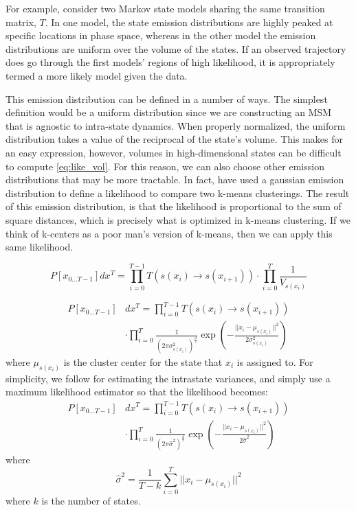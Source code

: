 \documentclass[twocolumn,floatfix,nofootinbib,aps]{revtex4-1}
\begin{document}
For example, consider two Markov state models sharing the same transition matrix, $T$. In one model, the state emission distributions are highly peaked at specific locations in phase space, whereas in the other model the emission distributions are uniform over the volume of the states. If an observed trajectory does go through the first models' regions of high likelihood, it is appropriately termed a more likely model given the data.

This emission distribution can be defined in a number of ways. The simplest definition would be a uniform distribution since we are constructing an MSM that is agnostic to intra-state dynamics. When properly normalized, the uniform distribution takes a value of the reciprocal of the state's volume. This makes for an easy expression, however, volumes in high-dimensional states can be difficult to compute \ref{eq:like_vol}. For this reason, we can also choose other emission distributions that may be more tractable. In fact, \citet{Pelleg2000Xmeans} have used a gaussian emission distribution to define a likelihood to compare two k-means clusterings. The result of this emission distribution, is that the likelihood is proportional to the sum of square distances, which is precisely what is optimized in k-means clustering. If we think of k-centers as a poor man's version of k-means, then we can apply this same likelihood.

\begin{equation}
\label{eq:like_vol}
P[x_{0...T-1}] dx^T = \prod_{i=0}^{T-1} T(s(x_i) \rightarrow s(x_{i+1})) \cdot \prod_{i=0}^T \frac{1}{V_{s(x_{i})}}
\end{equation}

\begin{equation}
\label{eq:like_mvn}
\begin{split}
P[x_{0...T-1}] & dx^T = \prod_{i=0}^{T-1} T(s(x_i) \rightarrow s(x_{i+1})) \\
	&\cdot \prod_{i=0}^T \frac{1}{\left(2 \pi \sigma_{s(x_{i})}^2\right)^\frac{d}{2}} \exp\left(-\frac{||x_i - \mu_{s(x_i)}||^2}{2 \sigma_{s(x_{i})}^2}\right)
\end{split}
\end{equation} where $\mu_{s(x_i)}$ is the cluster center for the state that $x_i$ is assigned to. For simplicity, we follow \citet{Pelleg2000Xmeans} for estimating the intrastate variances, and simply use a maximum likelihood estimator so that the likelihood becomes:
\begin{equation}
\label{eq:like_mvn}
\begin{split}
P[x_{0...T-1}] & dx^T = \prod_{i=0}^{T-1} T(s(x_i) \rightarrow s(x_{i+1})) \\
	&\cdot \prod_{i=0}^T \frac{1}{\left(2 \pi \hat{\sigma}^2\right)^\frac{d}{2}} \exp\left(-\frac{||x_i - \mu_{s(x_i)}||^2}{2 \hat{\sigma}^2}\right)
\end{split}
\end{equation} where
\begin{equation}
\label{eq:mle_sigma}
\hat{\sigma}^2 = \frac{1}{T - k} \sum_{i=0}^T || x_i - \mu_{s(x_i)} ||^2
\end{equation} where $k$ is the number of states.
\end{document}
